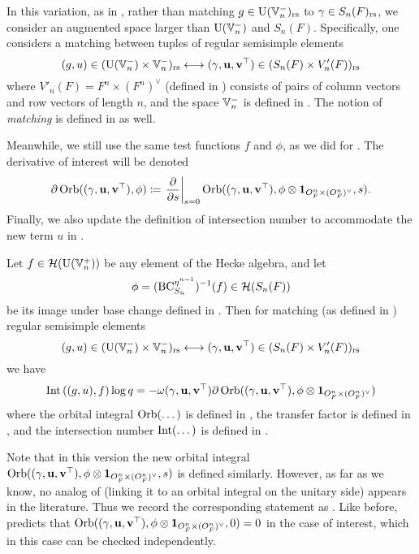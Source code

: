 In this variation, as in \cite{ref:liuFJ},
rather than matching $g \in \operatorname{U}(\mathbb V_n^-)_{\mathrm{rs}}$ to $\gamma \in S_n(F)_{\mathrm{rs}}$,
we consider an augmented space larger than $\operatorname{U}(\mathbb V_n^-)$ and $S_n(F)$.
Specifically, one considers a matching between tuples of regular semisimple elements
\[ (g, u) \in (\operatorname{U}(\mathbb V_n^-) \times \mathbb V_n^-)_{\mathrm{rs}}
  \longleftrightarrow (\gamma, \mathbf u, \mathbf v^\top) \in (S_n(F) \times V'_n(F))_{\mathrm{rs}} \]
where $V'_n(F) = F^n \times (F^n)^\vee$ (defined in )
consists of pairs of column vectors and row vectors of length $n$,
and the space $\mathbb V_n^-$ is defined in .
The notion of \emph{matching} is defined in  as well.

Meanwhile, we still use the same test functions $f$ and $\phi$,
as we did for \cite[Conjecture 6.2.1]{ref:AFLspherical}.
The derivative of interest will be denoted
\[ \partial \operatorname{Orb}({(\gamma, \mathbf u, \mathbf v^\top)}, \phi) \coloneqq
  \left. \pdv{}{s} \right\rvert_{s=0}
  \operatorname{Orb}((\gamma, \mathbf u, \mathbf v^\top), \phi \otimes \mathbf{1}_{O_F^n \times (O_F^n)^\vee}, s). \]
Finally, we also update the definition of intersection number
to accommodate the new term $u$ in .
\begin{conjecture}
  Let $f \in \mathcal H(\operatorname{U}(\mathbb V_n^+))$ be any element of the Hecke algebra, and let
  \[ \phi = (\operatorname{BC}_{S_n}^{\eta^{n-1}})^{-1}(f) \in \mathcal H(S_n(F)) \]
  be its image under base change defined in .
  Then for matching (as defined in ) regular semisimple elements
  \[ (g, u) \in (\operatorname{U}(\mathbb V_n^-) \times \mathbb V_n^-)_{\mathrm{rs}} \longleftrightarrow
    {(\gamma, \mathbf u, \mathbf v^\top)} \in (S_n(F) \times V'_n(F))_{\mathrm{rs}} \]
  we have
  \begin{equation}
    \operatorname{Int}\left( (g,u), f \right) \log q \\
    = -\omega{(\gamma, \mathbf u, \mathbf v^\top)} \partial \operatorname{Orb}({(\gamma, \mathbf u, \mathbf v^\top)}, \phi \otimes \mathbf{1}_{O_F^n \times (O_F^n)^\vee})
  \end{equation}
  where the orbital integral $\operatorname{Orb}(\dots)$ is defined in ,
  the transfer factor is defined in ,
  and the intersection number $\operatorname{Int}(\dots)$ is defined in .
  \label{conj:semi_lie_spherical}
\end{conjecture}
Note that in this version the new orbital integral $\operatorname{Orb}({(\gamma, \mathbf u, \mathbf v^\top)}, \phi \otimes \mathbf{1}_{O_F^n \times (O_F^n)^\vee}, s)$
is defined similarly.
However, as far as we know, no analog of 
(linking it to an orbital integral on the unitary side) appears in the literature.
Thus we record the corresponding statement as .
Like before, 
predicts that $\operatorname{Orb}({(\gamma, \mathbf u, \mathbf v^\top)}, \phi \otimes \mathbf{1}_{O_F^n \times (O_F^n)^\vee}, 0) = 0$ in the case of interest,
which in this case can be checked independently.

